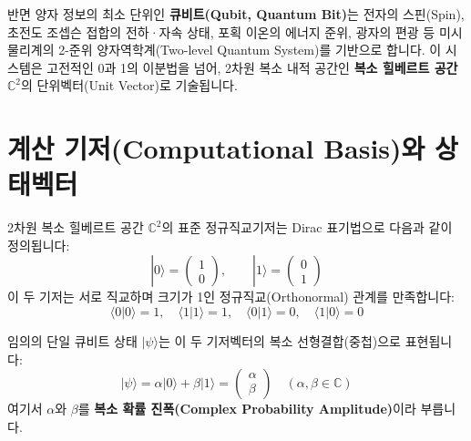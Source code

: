 \documentclass[11pt, a4paper]{article}
\newcommand{\ket}[1]{|#1\rangle}
\newcommand{\braket}[2]{\langle#1|#2\rangle}
\theoremstyle{definition}
\begin{document}
반면 양자 정보의 최소 단위인 \textbf{큐비트(Qubit, Quantum Bit)}는 전자의 스핀(Spin), 초전도 조셉슨 접합의 전하·자속 상태, 포획 이온의 에너지 준위, 광자의 편광 등 미시 물리계의 2-준위 양자역학계(Two-level Quantum System)를 기반으로 합니다.
이 시스템은 고전적인 0과 1의 이분법을 넘어, 2차원 복소 내적 공간인 \textbf{복소 힐베르트 공간 $\mathbb{C}^2$}의 단위벡터(Unit Vector)로 기술됩니다.

\section{계산 기저(Computational Basis)와 상태벡터}
2차원 복소 힐베르트 공간 $\mathbb{C}^2$의 표준 정규직교기저는 Dirac 표기법으로 다음과 같이 정의됩니다:
$$\ket{0} = \begin{pmatrix} 1 \\ 0 \end{pmatrix}, \qquad \ket{1} = \begin{pmatrix} 0 \\ 1 \end{pmatrix}$$
이 두 기저는 서로 직교하며 크기가 1인 정규직교(Orthonormal) 관계를 만족합니다:
$$\braket{0}{0} = 1, \quad \braket{1}{1} = 1, \quad \braket{0}{1} = 0, \quad \braket{1}{0} = 0$$

임의의 단일 큐비트 상태 $\ket{\psi}$는 이 두 기저벡터의 복소 선형결합(중첩)으로 표현됩니다:
$$\ket{\psi} = \alpha\ket{0} + \beta\ket{1} = \begin{pmatrix} \alpha \\ \beta \end{pmatrix} \quad (\alpha, \beta \in \mathbb{C})$$
여기서 $\alpha$와 $\beta$를 \textbf{복소 확률 진폭(Complex Probability Amplitude)}이라 부릅니다.
\end{document}
